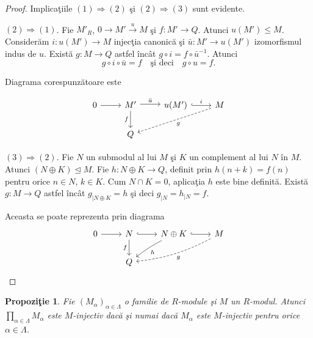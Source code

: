 \documentclass[12pt,a4paper]{book}
\newcommand{\ess}{\trianglelefteq}  %
\theoremstyle{plain}
\newtheorem{proposition}[theorem]{Propoziţie}
\theoremstyle{definition}
\theoremstyle{remark}
\begin{document}
\begin{proof}
Implicaţiile \((1) \Rightarrow (2)\) şi \((2) \Rightarrow (3)\) sunt evidente.

\medskip
\noindent\((2) \Rightarrow (1)\).
Fie \(M'_R\), \(0 \longrightarrow M' \xrightarrow{u} M\) şi
\(f : M' \to Q\).
Atunci \(u(M') \leq M\).
Considerăm \(i : u(M') \to M\) injecţia canonică şi
\(\bar{u} : M' \to u(M')\) izomorfismul indus de \(u\).
Există \(g : M \to Q\) astfel încât \(g \circ i = f \circ \bar{u}^{-1}\).
Atunci
\[
g \circ i \circ \bar{u} = f
\quad\text{şi deci}\quad
g \circ u = f.
\]

Diagrama corespunzătoare este

\[
\begin{tikzcd}
0 \arrow[r] &
M' \arrow[r,shift left=0.35ex,"\bar{u}"]
   \arrow[d,"f"'] &
u(M') \arrow[r,hook,"i"] &
M \arrow[dll,dashed,"g"] \\
& Q &
\end{tikzcd}
\]



\noindent\((3) \Rightarrow (2)\).
Fie \(N\) un submodul al lui \(M\) şi \(K\) un complement al lui \(N\) în \(M\).
Atunci \((N \oplus K) \ess M\).
Fie \(h : N \oplus K \to Q\), definit prin \(h(n+k) = f(n)\) pentru orice
\(n \in N\), \(k \in K\).
Cum \(N \cap K = 0\), aplicaţia \(h\) este bine definită.
Există \(g : M \to Q\) astfel încât \(g_{\mid N \oplus K} = h\) şi deci
\(g_{\mid N} = h_{\mid N} = f\).

Aceasta se poate reprezenta prin diagrama
\[
\begin{tikzcd}
0 \arrow[r] &
N \arrow[r,hook] \arrow[d,"f"'] &
N \oplus K \arrow[r,hook] \arrow[dl,bend right=5,"h"] &
M \arrow[dll,dashed,bend left=10,"g"] \\
& Q &
\end{tikzcd}
\]


\end{proof}


\begin{proposition}
Fie \((M_\alpha)_{\alpha \in \Lambda}\) o familie de \(R\)-module şi
\(M\) un \(R\)-modul.
Atunci \(\displaystyle \prod_{\alpha \in \Lambda} M_\alpha\) este
\(M\)-injectiv dacă şi numai dacă \(M_\alpha\) este \(M\)-injectiv
pentru orice \(\alpha \in \Lambda\).
\end{proposition}
\end{document}
